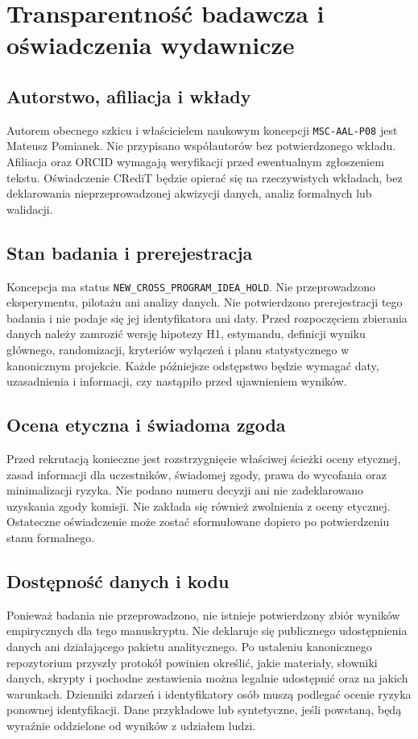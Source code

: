 \documentclass[11pt,a4paper]{article}
\begin{document}
\section*{Transparentność badawcza i oświadczenia wydawnicze}
\subsection*{Autorstwo, afiliacja i wkłady}
Autorem obecnego szkicu i właścicielem naukowym koncepcji \texttt{MSC-AAL-P08} jest Mateusz Pomianek. Nie przypisano współautorów bez potwierdzonego wkładu. Afiliacja oraz ORCID wymagają weryfikacji przed ewentualnym zgłoszeniem tekstu. Oświadczenie CRediT będzie opierać się na rzeczywistych wkładach, bez deklarowania nieprzeprowadzonej akwizycji danych, analiz formalnych lub walidacji.

\subsection*{Stan badania i prerejestracja}
Koncepcja ma status \texttt{NEW\_CROSS\_PROGRAM\_IDEA\_HOLD}. Nie przeprowadzono eksperymentu, pilotażu ani analizy danych. Nie potwierdzono prerejestracji tego badania i nie podaje się jej identyfikatora ani daty. Przed rozpoczęciem zbierania danych należy zamrozić wersję hipotezy H1, estymandu, definicji wyniku głównego, randomizacji, kryteriów wyłączeń i planu statystycznego w kanonicznym projekcie. Każde późniejsze odstępstwo będzie wymagać daty, uzasadnienia i informacji, czy nastąpiło przed ujawnieniem wyników.

\subsection*{Ocena etyczna i świadoma zgoda}
Przed rekrutacją konieczne jest rozstrzygnięcie właściwej ścieżki oceny etycznej, zasad informacji dla uczestników, świadomej zgody, prawa do wycofania oraz minimalizacji ryzyka. Nie podano numeru decyzji ani nie zadeklarowano uzyskania zgody komisji. Nie zakłada się również zwolnienia z oceny etycznej. Ostateczne oświadczenie może zostać sformułowane dopiero po potwierdzeniu stanu formalnego.

\subsection*{Dostępność danych i kodu}
Ponieważ badania nie przeprowadzono, nie istnieje potwierdzony zbiór wyników empirycznych dla tego manuskryptu. Nie deklaruje się publicznego udostępnienia danych ani działającego pakietu analitycznego. Po ustaleniu kanonicznego repozytorium przyszły protokół powinien określić, jakie materiały, słowniki danych, skrypty i pochodne zestawienia można legalnie udostępnić oraz na jakich warunkach. Dzienniki zdarzeń i identyfikatory osób muszą podlegać ocenie ryzyka ponownej identyfikacji. Dane przykładowe lub syntetyczne, jeśli powstaną, będą wyraźnie oddzielone od wyników z udziałem ludzi.
\end{document}
